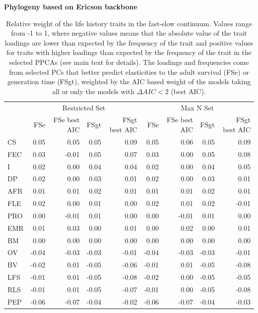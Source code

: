 \clearpage%
\begin{table}
\center
\caption[LHT relative importance of the FS axes]{
Relative weight of the life history traits in the fast-slow continuum. Values
range from -1 to 1, where negative values means that the absolute value of the
trait loadings are lower than expected by the frequency of the trait and
positive values for traits with higher loadings than expected by the frequency
of the trait in the selected PPCAs (see main text for details). The loadings and
frequencies come from selected PCs that better predict elasticities to the
adult survival (FSe) or generation time (FSgt), weighted by the AIC based weight
of the models taking all or only the models with $\Delta AIC < 2$ (best AIC).
}
\label{tab:tabApp2.3}
\begin{footnotesize}

\textbf{Phylogeny based on Ericson backbone}

\begin{tabular}{@{}l|rrrr|rrrr@{}}
\toprule
  & \multicolumn{4}{c|}{Restricted Set} & \multicolumn{4}{c}{Max N Set}\\
  & FSe & FSe best AIC & FSgt & FSgt best AIC & FSe & FSe best AIC & FSgt & FSgt best AIC\\
\midrule
CS & 0.05 & 0.05 & 0.05 & 0.09 & 0.05 & 0.06 & 0.05 & 0.09\\
FEC & 0.03 & -0.01 & 0.05 & 0.07 & 0.03 & 0.00 & 0.05 & 0.08\\
I & 0.02 & 0.00 & 0.04 & 0.04 & 0.02 & 0.00 & 0.04 & 0.05\\
DP & 0.02 & 0.00 & 0.03 & 0.01 & 0.02 & 0.00 & 0.03 & 0.01\\
AFB & 0.01 & 0.01 & 0.02 & 0.01 & 0.01 & 0.01 & 0.02 & 0.01\\
FLE & 0.02 & 0.00 & 0.01 & 0.00 & 0.02 & 0.01 & 0.02 & -0.01\\
PRO & 0.00 & -0.01 & 0.01 & 0.00 & 0.00 & -0.01 & 0.01 & 0.00\\
EMR & 0.01 & 0.03 & 0.00 & 0.01 & 0.00 & 0.02 & 0.00 & 0.01\\
BM & 0.00 & 0.00 & 0.00 & 0.00 & 0.00 & 0.00 & 0.00 & 0.00\\
OV & -0.04 & -0.03 & -0.03 & -0.01 & -0.04 & -0.03 & -0.03 & -0.01\\
BV & -0.02 & 0.01 & -0.05 & -0.06 & -0.01 & 0.01 & -0.05 & -0.08\\
LFS & -0.01 & 0.01 & -0.05 & -0.08 & -0.02 & 0.00 & -0.05 & -0.05\\
RLS & -0.01 & 0.01 & -0.05 & -0.07 & -0.01 & 0.00 & -0.05 & -0.08\\
PEP & -0.06 & -0.07 & -0.04 & -0.02 & -0.06 & -0.07 & -0.04 & -0.03\\
\bottomrule
\end{tabular}


\end{footnotesize}
\end{table}
